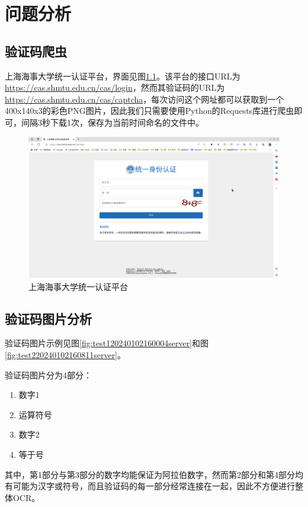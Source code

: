 \chapter{问题分析}
\label{chapter:2}

\section{验证码爬虫}

上海海事大学统一认证平台，界面见图\ref{fig:caswebpage}。该平台的接口URL为\url{https://cas.shmtu.edu.cn/cas/login}，然而其验证码的URL为\url{https://cas.shmtu.edu.cn/cas/captcha}，每次访问这个网址都可以获取到一个400x140x3的彩色PNG图片，因此我们只需要使用Python的Requests库进行爬虫即可，间隔3秒下载1次，保存为当前时间命名的文件中。

\begin{figure}
	\centering
	\includegraphics[width=0.9\linewidth]{Resources/Picture/CAS/cas_webpage}
	\caption{上海海事大学统一认证平台}
	\label{fig:caswebpage}
\end{figure}

\section{验证码图片分析}

验证码图片示例见图\ref{fig:test120240102160004server}和图\ref{fig:test220240102160811server}。

验证码图片分为4部分：

\begin{enumerate}
	\item 数字1
	\item 运算符号
	\item 数字2
	\item 等于号
\end{enumerate}

其中，第1部分与第3部分的数字均能保证为阿拉伯数字，然而第2部分和第4部分均有可能为汉字或符号，而且验证码的每一部分经常连接在一起，因此不方便进行整体OCR。

